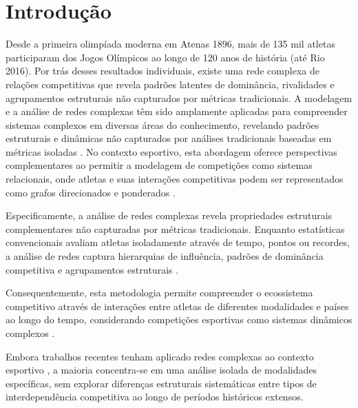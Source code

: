 \chapter{Introdução}
\label{cap:introducao}

Desde a primeira olimpíada moderna em Atenas 1896, mais de 135 mil atletas participaram dos Jogos Olímpicos ao longo de 120 anos de história (até Rio 2016). Por trás desses resultados individuais, existe uma rede complexa de relações competitivas que revela padrões latentes de dominância, rivalidades e agrupamentos estruturais não capturados por métricas tradicionais. A modelagem e a análise de redes complexas têm sido amplamente aplicadas para compreender sistemas complexos em diversas áreas do conhecimento, revelando padrões estruturais e dinâmicas não capturados por análises tradicionais baseadas em métricas isoladas \cite{Ahmed2023ComplexNetworks}. No contexto esportivo, esta abordagem oferece perspectivas complementares ao permitir a modelagem de competições como sistemas relacionais, onde atletas e suas interações competitivas podem ser representados como grafos direcionados e ponderados \cite{Radicchi2016OlympicDominance}.

Especificamente, a análise de redes complexas revela propriedades estruturais complementares não capturadas por métricas tradicionais. Enquanto estatísticas convencionais avaliam atletas isoladamente através de tempo, pontos ou recordes, a análise de redes captura hierarquias de influência, padrões de dominância competitiva e agrupamentos estruturais \cite{Wasche2017EmergingParadigm, LopezFelip2018ClusterPhase}.

Consequentemente, esta metodologia permite compreender o ecossistema competitivo através de interações entre atletas de diferentes modalidades e países ao longo do tempo, considerando competições esportivas como sistemas dinâmicos complexos \cite{Davids2013}.

Embora trabalhos recentes tenham aplicado redes complexas ao contexto esportivo \cite{Motegi2012NetworkBased, Shiue2025ApplyingPageRank}, a maioria concentra-se em uma análise isolada de modalidades específicas, sem explorar diferenças estruturais sistemáticas entre tipos de interdependência competitiva ao longo de períodos históricos extensos.


